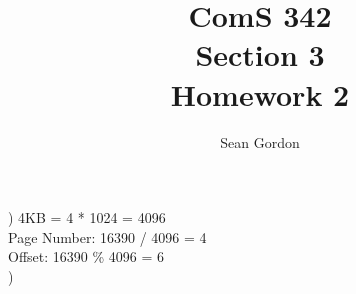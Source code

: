 \documentclass[12pt]{article}
\title{ComS 342\\Section 3\\Homework 2}
\author{Sean Gordon}
\begin{document}
\maketitle

) 4KB = 4 * 1024 = 4096\\
Page Number: 16390 / 4096 = 4\\
Offset: 16390 \% 4096 = 6\\

) 


\end{document}
